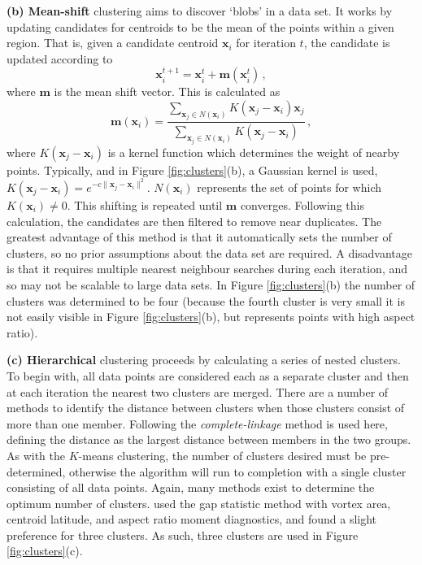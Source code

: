 \bigskip\noindent\textbf{(b) Mean-shift} clustering aims to discover `blobs' in
a data set. It works by updating candidates for centroids to be the mean of the
points within a given region. That is, given a candidate centroid $\mathbf{x}_i$
for iteration $t$, the candidate is updated according to
\begin{equation}
  \mathbf{x}^{t+1}_{i} = \mathbf{x}^t_i + \mathbf{m}(\mathbf{x}^t_i) \, ,
\end{equation}
where $\mathbf{m}$ is the mean shift vector. This is calculated as
\begin{equation}
  \mathbf{m}(\mathbf{x}_i) = \frac{\sum_{\mathbf{x}_j \in N(\mathbf{x}_i)}K(\mathbf{x}_j-\mathbf{x}_i)\mathbf{x}_j}{\sum_{\mathbf{x}_j
      \in N(\mathbf{x}_i)}K(\mathbf{x}_j-\mathbf{x}_i)} \, ,
\end{equation}
where $K(\mathbf{x}_j-\mathbf{x}_i)$ is a kernel function which determines the
weight of nearby points. Typically, and in Figure \ref{fig:clusters}(b), a
Gaussian kernel is used,
$K(\mathbf{x}_j-\mathbf{x}_i) = e^{-c\|\mathbf{x}_j-\mathbf{x}_i\|^2}$.
$N(\mathbf{x}_i)$ represents the set of points for which
$K(\mathbf{x}_i) \ne 0$. This shifting is repeated until $\mathbf{m}$
converges. Following this calculation, the candidates are then filtered to
remove near duplicates. The greatest advantage of this method is that it
automatically sets the number of clusters, so no prior assumptions about the
data set are required. A disadvantage is that it requires multiple nearest
neighbour searches during each iteration, and so may not be scalable to large
data sets. In Figure \ref{fig:clusters}(b) the number of clusters was determined
to be four (because the fourth cluster is very small it is not easily visible in
Figure \ref{fig:clusters}(b), but represents points with high aspect ratio).

\bigskip\noindent\textbf{(c) Hierarchical} clustering proceeds by calculating a
series of nested clusters. To begin with, all data points are considered each as
a separate cluster and then at each iteration the nearest two clusters are
merged. There are a number of methods to identify the distance between clusters
when those clusters consist of more than one member. Following
\citet{Hannachi2010} the \emph{complete-linkage} method is used here, defining
the distance as the largest distance between members in the two groups. As with
the $K$-means clustering, the number of clusters desired must be pre-determined,
otherwise the algorithm will run to completion with a single cluster consisting
of all data points. Again, many methods exist to determine the optimum number of
clusters. \citet{Hannachi2010} used the gap statistic method
\citep{Tibshirani2001} with vortex area, centroid latitude, and aspect ratio
moment diagnostics, and found a slight preference for three clusters. As such,
three clusters are used in Figure \ref{fig:clusters}(c).


